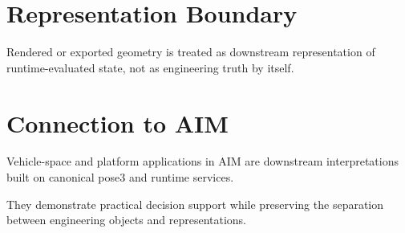 \section{Representation Boundary}

Rendered or exported geometry is treated as downstream representation of
runtime-evaluated state, not as engineering truth by itself.

\section{Connection to AIM}

\begin{summary}
Vehicle-space and platform applications in AIM are downstream
interpretations built on canonical pose3 and runtime services.

They demonstrate practical decision support while preserving the
separation between engineering objects and representations.
\end{summary}
